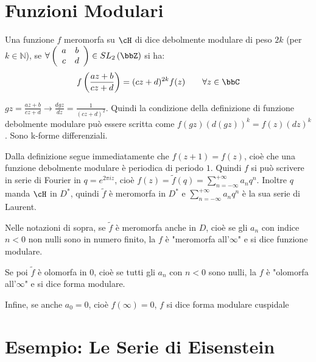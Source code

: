\section{Funzioni Modulari}

\begin{definizione}
Una funzione $f$ meromorfa su $\cH$ di dice debolmente modulare di peso $2k$ (per $k \in \mathbb{N}$), se $\forall
\left( \begin{array}{cc} a & b \\ c & d \end{array} \right) \in
SL_2 \left( \bbZ \right)$ si ha:
$$ f\left( \frac{az+b}{cz+d} \right) = (cz+d)^{2k} f(z)
\qquad \forall z \in \bbC$$
\end{definizione}

\begin{osservazione}
$\displaystyle{gz=\frac{az+b}{cz+d} \rightarrow
\frac{dgz}{dz}=\frac{1}{(cz+d)^2}}$. Quindi la condizione della definizione di
funzione debolmente modulare può essere scritta come $f(gz)(d(gz))^k=f(z)(dz)^k$.
Sono k-forme differenziali.
\end{osservazione}

\begin{osservazione}
Dalla definizione segue immediatamente che $f(z+1)=f(z)$, cioè che una
funzione debolmente modulare è periodica di periodo $1$. Quindi $f$ si può scrivere in serie di Fourier in $q=e^{2 \pi i z}$, cioè
$\displaystyle{f(z)=\widetilde{f}(q)=\sum^{+\infty}_{n=-\infty}{a_n q^n}}$.
Inoltre $q$ manda $\cH$ in $D^*$, quindi $\widetilde{f}$ è meromorfa
in $D^*$ e $\displaystyle{\sum^{+\infty}_{n=-\infty}{a_n q^n}}$ è la sua
serie di Laurent.
\end{osservazione}

\begin{definizione}
Nelle notazioni di sopra, se $\widetilde{f}$ è meromorfa anche in $D$, cioè
se gli $a_n$ con indice $n<0$ non nulli sono in numero finito, la $f$
è "meromorfa all'$\infty$" e si dice funzione modulare.

Se poi $\widetilde{f}$ è olomorfa in $0$, cioè se tutti gli $a_n$ con $n<0$
sono nulli, la $f$ è "olomorfa all'$\infty$" e si dice forma modulare.

Infine, se anche $a_0=0$, cioè $f(\infty)=0$, $f$ si dice forma modulare
cuspidale
\end{definizione}

\section{Esempio: Le Serie di Eisenstein}


